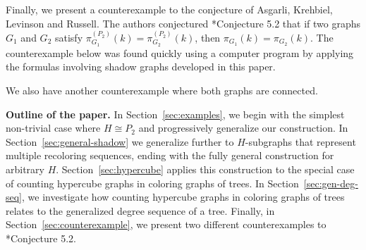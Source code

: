 \documentclass[12pt,reqno,dvipsnames]{amsart}
\theoremstyle{definition}
\begin{document}
Finally, we present a counterexample to the conjecture of Asgarli, Krehbiel, Levinson and Russell. The authors conjectured \cite{AKLR25}*{Conjecture 5.2} that if two graphs $G_1$ and $G_2$ satisfy $\pi_{G_1}^{(P_2)}(k)=\pi_{G_2}^{(P_2)}(k)$, then $\pi_{G_1}(k)=\pi_{G_2}(k)$. The counterexample below was found quickly using a computer program by applying the formulas involving shadow graphs developed in this paper.  
\begin{figure}[ht]
    \centering
\end{figure}

We also have another counterexample where both graphs are connected.

\smallskip 

\textbf{Outline of the paper.} In Section~\ref{sec:examples}, we begin with the simplest non-trivial case where $H \cong P_2$ and progressively generalize our construction. In Section~\ref{sec:general-shadow} we generalize further to $H$-subgraphs that represent multiple recoloring sequences, ending with the fully general construction for arbitrary $H$. Section~\ref{sec:hypercube} applies this construction to the special case of counting hypercube graphs in coloring graphs of trees. In Section~\ref{sec:gen-deg-seq}, we investigate how counting hypercube graphs in coloring graphs of trees relates to the generalized degree sequence of a tree. Finally, in Section~\ref{sec:counterexample}, we present two different counterexamples to \cite{AKLR25}*{Conjecture 5.2}.
\end{document}
